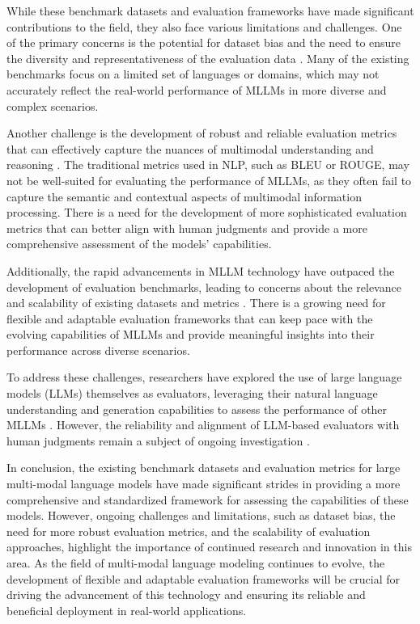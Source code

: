 \documentclass[11pt]{article}
\begin{document}
While these benchmark datasets and evaluation frameworks have made significant contributions to the field, they also face various limitations and challenges. One of the primary concerns is the potential for dataset bias and the need to ensure the diversity and representativeness of the evaluation data \cite{ref147}. Many of the existing benchmarks focus on a limited set of languages or domains, which may not accurately reflect the real-world performance of MLLMs in more diverse and complex scenarios.

Another challenge is the development of robust and reliable evaluation metrics that can effectively capture the nuances of multimodal understanding and reasoning \cite{ref148}. The traditional metrics used in NLP, such as BLEU or ROUGE, may not be well-suited for evaluating the performance of MLLMs, as they often fail to capture the semantic and contextual aspects of multimodal information processing. There is a need for the development of more sophisticated evaluation metrics that can better align with human judgments and provide a more comprehensive assessment of the models' capabilities.

Additionally, the rapid advancements in MLLM technology have outpaced the development of evaluation benchmarks, leading to concerns about the relevance and scalability of existing datasets and metrics \cite{ref60}. There is a growing need for flexible and adaptable evaluation frameworks that can keep pace with the evolving capabilities of MLLMs and provide meaningful insights into their performance across diverse scenarios.

To address these challenges, researchers have explored the use of large language models (LLMs) themselves as evaluators, leveraging their natural language understanding and generation capabilities to assess the performance of other MLLMs \cite{ref149}. However, the reliability and alignment of LLM-based evaluators with human judgments remain a subject of ongoing investigation \cite{ref60,ref150}.

In conclusion, the existing benchmark datasets and evaluation metrics for large multi-modal language models have made significant strides in providing a more comprehensive and standardized framework for assessing the capabilities of these models. However, ongoing challenges and limitations, such as dataset bias, the need for more robust evaluation metrics, and the scalability of evaluation approaches, highlight the importance of continued research and innovation in this area. As the field of multi-modal language modeling continues to evolve, the development of flexible and adaptable evaluation frameworks will be crucial for driving the advancement of this technology and ensuring its reliable and beneficial deployment in real-world applications.
\end{document}
